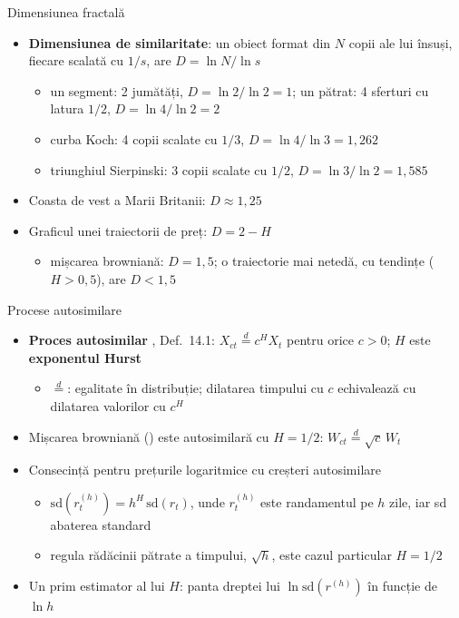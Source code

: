 \begin{frame}{Dimensiunea fractală}
\itemsize{\small}
\begin{itemize}
    \item \textbf{Dimensiunea de similaritate}: un obiect format din $N$ copii ale lui însuși, fiecare scalată cu $1/s$, are $D = \ln N/\ln s$
    \begin{itemize}
        \item un segment: 2 jumătăți, $D = \ln 2/\ln 2 = 1$; un pătrat: 4 sferturi cu latura $1/2$, $D = \ln 4/\ln 2 = 2$
        \item curba Koch: 4 copii scalate cu $1/3$, $D = \ln 4/\ln 3 = 1{,}262$
        \item triunghiul Sierpinski: 3 copii scalate cu $1/2$, $D = \ln 3/\ln 2 = 1{,}585$
    \end{itemize}
    \item Coasta de vest a Marii Britanii: $D \approx 1{,}25$ 
    \item Graficul unei traiectorii de preț: $D = 2 - H$
    \begin{itemize}
        \item mișcarea browniană: $D = 1{,}5$; o traiectorie mai netedă, cu tendințe ($H > 0{,}5$), are $D < 1{,}5$
    \end{itemize}
\end{itemize}
\end{frame}

\begin{frame}{Procese autosimilare}
\itemsize{\small}
\begin{itemize}
    \item \textbf{Proces autosimilar} , Def.~14.1: $X_{ct} \overset{d}{=} c^H X_t$ pentru orice $c > 0$; $H$ este \textbf{exponentul Hurst}
    \begin{itemize}
        \item $\overset{d}{=}$: egalitate în distribuție; dilatarea timpului cu $c$ echivalează cu dilatarea valorilor cu $c^H$
    \end{itemize}
    \item Mișcarea browniană () este autosimilară cu $H = 1/2$: $W_{ct} \overset{d}{=} \sqrt{c}\,W_t$
    \item Consecință pentru prețurile logaritmice cu creșteri autosimilare
    \begin{itemize}
        \item $\mathrm{sd}(r_t^{(h)}) = h^H\,\mathrm{sd}(r_t)$, unde $r_t^{(h)}$ este randamentul pe $h$ zile, iar sd abaterea standard
        \item regula rădăcinii pătrate a timpului, $\sqrt{h}$, este cazul particular $H = 1/2$
    \end{itemize}
    \item Un prim estimator al lui $H$: panta dreptei lui $\ln \mathrm{sd}(r^{(h)})$ în funcție de $\ln h$
\end{itemize}
\end{frame}

